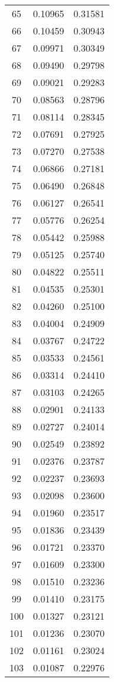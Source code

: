\documentclass{elsarticle}
\begin{document}
\begin{center}
\begin{longtable}{|c|cc|}
  65 & 0.10965 & 0.31581 \\
  66 & 0.10459 & 0.30943 \\
  67 & 0.09971 & 0.30349 \\
  68 & 0.09490 & 0.29798 \\
  69 & 0.09021 & 0.29283 \\
  70 & 0.08563 & 0.28796 \\
  71 & 0.08114 & 0.28345 \\
  72 & 0.07691 & 0.27925 \\
  73 & 0.07270 & 0.27538 \\
  74 & 0.06866 & 0.27181 \\
  75 & 0.06490 & 0.26848 \\
  76 & 0.06127 & 0.26541 \\
  77 & 0.05776 & 0.26254 \\
  78 & 0.05442 & 0.25988 \\
  79 & 0.05125 & 0.25740 \\
  80 & 0.04822 & 0.25511 \\
  81 & 0.04535 & 0.25301 \\
  82 & 0.04260 & 0.25100 \\
  83 & 0.04004 & 0.24909 \\
  84 & 0.03767 & 0.24722 \\
  85 & 0.03533 & 0.24561 \\
  86 & 0.03314 & 0.24410 \\
  87 & 0.03103 & 0.24265 \\
  88 & 0.02901 & 0.24133 \\
  89 & 0.02727 & 0.24014 \\
  90 & 0.02549 & 0.23892 \\
  91 & 0.02376 & 0.23787 \\
  92 & 0.02237 & 0.23693 \\
  93 & 0.02098 & 0.23600 \\
  94 & 0.01960 & 0.23517 \\
  95 & 0.01836 & 0.23439 \\
  96 & 0.01721 & 0.23370 \\
  97 & 0.01609 & 0.23300 \\
  98 & 0.01510 & 0.23236 \\
  99 & 0.01410 & 0.23175 \\
  100 & 0.01327 & 0.23121 \\
  101 & 0.01236 & 0.23070 \\
  102 & 0.01161 & 0.23024 \\
  103 & 0.01087 & 0.22976 \\

\end{longtable}
\end{center}
\end{document}

